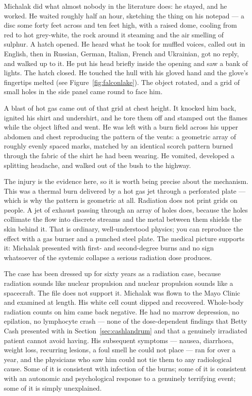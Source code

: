 Michalak did what almost nobody in the literature does: he stayed, and he worked. He waited
roughly half an hour, sketching the thing on his notepad --- a disc some forty feet across and ten
feet high, with a raised dome, cooling from red to hot grey-white, the rock around it steaming and
the air smelling of sulphur. A hatch opened. He heard what he took for muffled voices, called out
in English, then in Russian, German, Italian, French and Ukrainian, got no reply, and walked up to
it. He put his head briefly inside the opening and saw a bank of lights. The hatch closed. He
touched the hull with his gloved hand and the glove's fingertips melted (see
Figure~\ref{fig:falconlake}). The object rotated, and a grid of small holes in the side panel came
round to face him.

 A blast of hot gas came out of that grid at chest height. It knocked him back, ignited
his shirt and undershirt, and he tore them off and stamped out the flames while the object lifted
and went. He was left with a burn field across his upper abdomen and chest reproducing the pattern
of the vents: a geometric array of roughly evenly spaced marks, matched by an identical scorch
pattern burned through the fabric of the shirt he had been wearing. He vomited, developed a
splitting headache, and walked out of the bush to the highway.

The injury is the evidence here, so it is worth being precise about the mechanism. This was a
thermal burn delivered by a hot gas jet through a perforated plate --- which is why the pattern is
geometric at all. Radiation does not print grids on people. A jet of exhaust passing through an
array of holes does, because the holes collimate the flow into discrete streams and the metal
between them shields the skin behind it. That is ordinary, well-understood physics; you can
reproduce the effect with a gas burner and a punched steel plate. The medical picture supports it:
Michalak presented with first- and second-degree burns and no sign whatsoever of the systemic
collapse a serious radiation dose produces.

 The
case has been dressed up for sixty years as a radiation case, because radiation sounds like
nuclear propulsion and nuclear propulsion sounds like a spacecraft. The file does not support it.
Michalak was flown to the Mayo Clinic and examined at length. His white cell count dipped and
recovered. Whole-body radiation counts on him came back negative. He had no marrow depression, no
epilation, no lymphocyte crash --- none of the dose-dependent findings that Betty Cash presented
with in Section~\ref{sec:cashlandrum} and that a genuinely irradiated patient cannot avoid having. His subsequent
symptoms --- nausea, diarrhoea, weight loss, recurring lesions, a foul smell he could not place ---
ran for over a year, and the physicians who saw him could not tie them to any radiological cause.
Some of it is consistent with infection of the burns; some of it is consistent with an autonomic
and psychological response to a genuinely terrifying event; some of it is simply unexplained.

